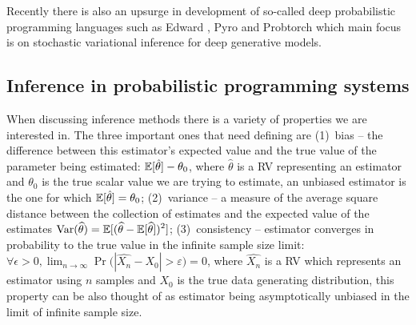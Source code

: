 \documentclass[12pt]{article}
\begin{document}
Recently there is also an upsurge in development of so-called deep probabilistic programming languages such as Edward \citep{TranEtAl2016}, Pyro \citep{Pyro2018} and Probtorch \citep{Siddharth2017} which main focus is on stochastic variational inference for deep generative models.



\subsection{Inference in probabilistic programming systems}
\label{sec:inference-prob-prog}

When discussing inference methods there is a variety of properties we are interested in.
The three important ones that need defining are 
(1)~bias -- the difference between this estimator's expected value and the true value of the parameter being estimated: 
$\mathbb{E} [\hat{\theta}] - \theta_0$, 
where $\hat{\theta}$ is a RV representing an estimator and $\theta_0$ is the true scalar value we are trying to estimate,
an unbiased estimator is the one for which $\mathbb{E} [\hat{\theta}] = \theta_0$;
(2)~variance -- a measure of the average square distance between the collection of estimates and the expected value of the estimates
${\displaystyle \operatorname {Var} ({\widehat {\theta }})=\mathbb{E} [({\widehat {\theta }}-\mathbb{E} [{\widehat {\theta }}])^{2}]}$;
(3)~consistency -- estimator converges in probability to the true value in the infinite sample size limit: 
$\forall \epsilon>0, \lim _{n\to \infty}\Pr {\big (}|\hat{X_{n}}-X_0| > \varepsilon {\big )}=0$, 
where $\hat{X_n}$ is a RV which represents an estimator using $n$ samples and $X_0$ is the true data generating distribution,
this property can be also thought of as estimator being asymptotically unbiased in the limit of infinite sample size.
\end{document}
